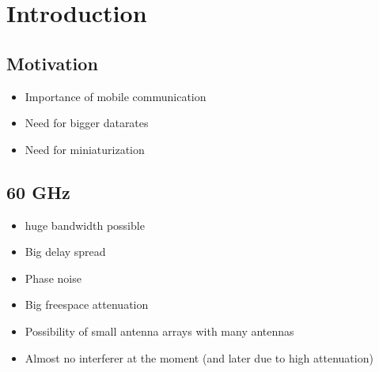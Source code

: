\chapter{Introduction}
\label{ch:introduction}

\section{Motivation}
\begin{itemize}
\item Importance of mobile communication
\item Need for bigger datarates
\item Need for miniaturization
\end{itemize}

\section{60 GHz}
\begin{itemize}
\item huge bandwidth possible
\item Big delay spread
\item Phase noise
\item Big freespace attenuation
\item Possibility of small antenna arrays with many antennas
\item Almost no interferer at the moment (and later due to high attenuation)
\end{itemize}

